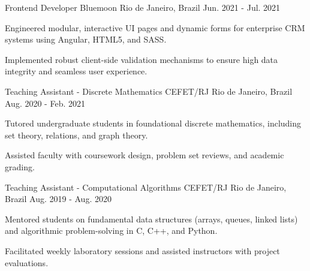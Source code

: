 \begin{cventries}

  \cventry
    {Frontend Developer} %
    {Bluemoon} %
    {Rio de Janeiro, Brazil} %
    {Jun. 2021 - Jul. 2021} %
    {
      \begin{cvitems} %
        \item {Engineered modular, interactive UI pages and dynamic forms for enterprise CRM systems using Angular, HTML5, and SASS.}
        \item {Implemented robust client-side validation mechanisms to ensure high data integrity and seamless user experience.}
      \end{cvitems}
    }

  \cventry
    {Teaching Assistant - Discrete Mathematics} %
    {CEFET/RJ} %
    {Rio de Janeiro, Brazil} %
    {Aug. 2020 - Feb. 2021} %
    {
      \begin{cvitems} %
        \item {Tutored undergraduate students in foundational discrete mathematics, including set theory, relations, and graph theory.}
        \item {Assisted faculty with coursework design, problem set reviews, and academic grading.}
      \end{cvitems}
    }

  \cventry
    {Teaching Assistant - Computational Algorithms} %
    {CEFET/RJ} %
    {Rio de Janeiro, Brazil} %
    {Aug. 2019 - Aug. 2020} %
    {
      \begin{cvitems} %
        \item {Mentored students on fundamental data structures (arrays, queues, linked lists) and algorithmic problem-solving in C, C++, and Python.}
        \item {Facilitated weekly laboratory sessions and assisted instructors with project evaluations.}
      \end{cvitems}
    }

\end{cventries}

